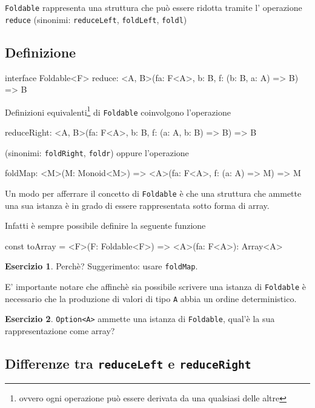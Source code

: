 \documentclass[12pt]{article}
\theoremstyle{definition}
\newtheorem{exercise}{Esercizio}[section]
\newenvironment{code}
  {\vspace{0.5cm} \VerbatimEnvironment\begin{typescriptcode}}
  {\end{typescriptcode} \vspace{0.2cm}}
\begin{document}
\texttt{Foldable} rappresenta una struttura che può essere ridotta tramite l' operazione \texttt{reduce}
(sinonimi: \texttt{reduceLeft}, \texttt{foldLeft}, \texttt{foldl})

\subsection{Definizione}

\begin{code}
interface Foldable<F> {
  reduce: <A, B>(fa: F<A>, b: B, f: (b: B, a: A) => B) => B
}
\end{code}

Definizioni equivalenti\footnote{ovvero ogni operazione può essere derivata da una qualsiasi delle altre} di \texttt{Foldable}
coinvolgono l'operazione

\begin{code}
reduceRight: <A, B>(fa: F<A>, b: B, f: (a: A, b: B) => B) => B
\end{code}

(sinonimi: \texttt{foldRight}, \texttt{foldr}) oppure l'operazione

\begin{code}
foldMap: <M>(M: Monoid<M>) =>
  <A>(fa: F<A>, f: (a: A) => M) => M
\end{code}

Un modo per afferrare il concetto di \texttt{Foldable} è che una struttura che ammette una sua istanza
è in grado di essere rappresentata sotto forma di array.

Infatti è sempre possibile definire la seguente funzione

\begin{code}
const toArray = <F>(F: Foldable<F>) => <A>(fa: F<A>): Array<A>
\end{code}

\begin{exercise}
Perchè? Suggerimento: usare \texttt{foldMap}.
\end{exercise}

E' importante notare che affinchè sia possibile scrivere una istanza di \texttt{Foldable} è necessario che la produzione di valori
di tipo \texttt{A} abbia un ordine deterministico.

\begin{exercise}
\texttt{Option<A>} ammette una istanza di \texttt{Foldable}, qual'è la sua rappresentazione come array?
\end{exercise}

\subsection{Differenze tra \texttt{reduceLeft} e \texttt{reduceRight}}
\end{document}
